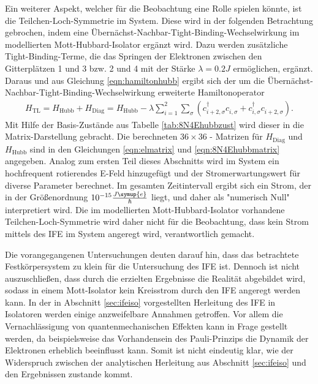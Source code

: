 Ein weiterer Aspekt, welcher für die Beobachtung eine Rolle spielen könnte, ist die Teilchen-Loch-Symmetrie im System.
Diese wird in der folgenden Betrachtung gebrochen, indem eine Übernächst-Nachbar-Tight-Binding-Wechselwirkung im modellierten Mott-Hubbard-Isolator
ergänzt wird. Dazu werden zusätzliche Tight-Binding-Terme, die das Springen der Elektronen zwischen den Gitterplätzen 1 und 3 bzw. 2 und 4
mit der Stärke $\lambda = 0.2 J$ ermöglichen, ergänzt. Daraus und aus Gleichung \eqref{eqn:hamiltonhubb} ergibt sich der um die Übernächst-Nachbar-Tight-Binding-Wechselwirkung erweiterte Hamiltonoperator
\begin{align}
  H_\text{TL} = H_\text{Hubb} + H_\text{Diag} = H_\text{Hubb} - \lambda \sum_{i=1}^2 \sum_{\sigma} \left(c_{i+2,\sigma}^{\dag}c_{i,\sigma}^{\phantom{\dag}} + c_{i,\sigma}^{\dag}c_{i+2,\sigma}^{\phantom{\dag}} \right).
\end{align}
Mit Hilfe der Basis-Zustände aus Tabelle \ref{tab:8N4Ehubbzust} wird dieser in die Matrix-Darstellung gebracht. Die berechneten $36 \times 36$ - Matrizen für $H_\text{Diag}$ und $H_\text{Hubb}$ sind in den Gleichungen
\eqref{eqn:elmatrix} und \eqref{eqn:8N4Ehubbmatrix} angegeben.
Analog zum ersten Teil dieses Abschnitts wird im System ein hochfrequent rotierendes E-Feld hinzugefügt und der Stromerwartungswert für diverse Parameter berechnet. Im gesamten Zeitintervall ergibt sich
ein Strom, der in der Größenordnung $10^{-15} \frac{J\symup{e}}{\hbar}$ liegt, und daher als "numerisch Null" interpretiert wird. Die im modellierten Mott-Hubbard-Isolator vorhandene
Teilchen-Loch-Symmetrie wird daher nicht für die Beobachtung, dass kein Strom mittels des IFE im System angeregt wird, verantwortlich gemacht.

Die vorangegangenen Untersuchungen deuten darauf hin, dass das betrachtete Festkörpersystem zu klein für die Untersuchung des IFE ist.
Dennoch ist nicht auszuschließen, dass durch die erzielten Ergebnisse die Realität abgebildet wird, sodass in einem Mott-Isolator kein
Kreisstrom durch den IFE angeregt werden kann.
In der in Abschnitt \ref{sec:ifeiso} vorgestellten Herleitung des IFE in Isolatoren werden einige anzweifelbare Annahmen getroffen.
Vor allem die Vernachlässigung von quantenmechanischen Effekten kann in Frage gestellt werden,
da beispielsweise das Vorhandensein des Pauli-Prinzips die Dynamik der Elektronen erheblich beeinflusst kann.
Somit ist nicht eindeutig klar, wie der Widerspruch zwischen der analytischen Herleitung aus Abschnitt \ref{sec:ifeiso} und den Ergebnissen zustande kommt.
